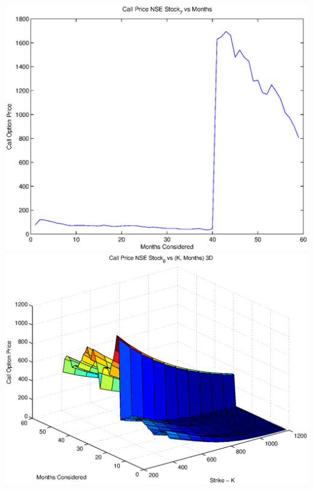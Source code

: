 \documentclass{article}
\begin{document}
\includegraphics[width=\textwidth]{Call_Price_NSE_Stock_7_vs_Months} \\

\includegraphics[width=\textwidth]{Call_Price_NSE_Stock_8_vs_(K,_Months)_3D} \\
\end{document}
